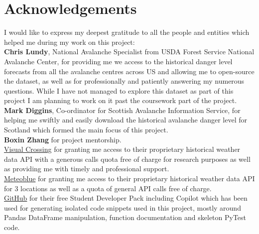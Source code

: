 \documentclass{article}
\begin{document}
	\section*{Acknowledgements}
	I would like to express my deepest gratitude to all the people and entities which helped me during my work on this project:\\
			\textbf{Chris Lundy}, National Avalanche Specialist from USDA Forest Service National Avalanche Center, for providing me we access to the historical danger level forecasts from all the avalanche centres across US and allowing me to open-source the dataset, as well as for professionally and patiently answering my numerous questions. While I have not managed to explore this dataset as part of this project I am planning to work on it past the coursework part of the project. \\
			\textbf{Mark Diggins}, Co-ordinator for Scottish Avalanche Information Service, for helping me swiftly and easily download the historical avalanche danger level for Scotland which formed the main focus of this project.\\
			\textbf{Boxin Zhang} for project mentorship.\\
			\href{https://www.visualcrossing.com/}{Visual Crossing} for granting me access to their proprietary historical weather data API with a generous calls quota free of charge for research purposes as well as providing me with timely and professional support.\\
			\href{https://www.meteoblue.com/}{Meteoblue} for granting me access to their proprietary historical weather data API for 3 locations as well as a quota of general API calls free of charge.\\
			\href{https://github.com/}{GitHub} for their free Student Developer Pack including Copilot which has been used for generating isolated code snippets used in this project, mostly around Pandas DataFrame manipulation, function documentation and skeleton PyTest code.

\newpage

\end{document}
